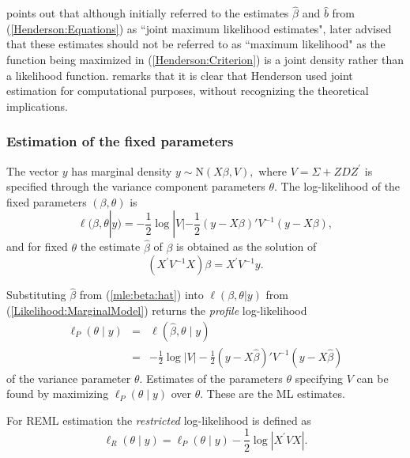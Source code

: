 \documentclass[MAIN.tex]{subfiles}
\begin{document}
	\cite{Robi:BLUP:1991} points out that although \cite{Henderson:1950} initially referred to the estimates $\hat{\beta}$ and $\hat{b}$ from (\ref{Henderson:Equations}) as ``joint maximum likelihood estimates", \cite{Henderson:1973} later advised that these estimates should not be referred to as ``maximum likelihood" as the function being maximized in (\ref{Henderson:Criterion}) is a joint density rather than a likelihood function. \cite{Lee:Neld:Pawi:2006} remarks that it is clear that Henderson used joint estimation for computational purposes, without recognizing the theoretical implications.
	
	\subsubsection{Estimation of the fixed parameters}
	
	The vector $y$ has marginal density $y \sim \mathrm{N}(X \beta,V),$ where $V = \Sigma + ZDZ^\prime$ is specified through the variance component parameters $\theta.$ The log-likelihood of the fixed parameters $(\beta, \theta)$ is
	\begin{equation}
	\ell (\beta, \theta|y) =
	-\frac{1}{2} \log |V| -\frac{1}{2}(y -
	X \beta)'V^{-1}(y -
	X \beta), \label{Likelihood:MarginalModel}
	\end{equation}
	and for fixed $\theta$ the estimate $\hat{\beta}$ of $\beta$ is obtained as the solution of
	\begin{equation}
	(X^\prime V^{-1}X) {\beta} = X^\prime V^{-1}y.
	\label{mle:beta:hat}
	\end{equation}
	
	Substituting $\hat{\beta}$ from (\ref{mle:beta:hat}) into $\ell(\beta, \theta|y)$ from (\ref{Likelihood:MarginalModel}) returns the \emph{profile} log-likelihood
	\begin{eqnarray*}
		\ell_P(\theta \mid y) &=& \ell(\hat{\beta}, \theta \mid y) \\
		&=& -\frac{1}{2} \log |V| -\frac{1}{2}(y - X \hat{\beta})'V^{-1}(y - X \hat{\beta})
	\end{eqnarray*}
	of the variance parameter $\theta.$ Estimates of the parameters $\theta$ specifying $V$ can be found by maximizing $\ell_P(\theta \mid y)$ over $\theta.$ These are the ML estimates.
	
	For REML estimation the \emph{restricted} log-likelihood is defined as
	\[
	\ell_R(\theta \mid y) =
	\ell_P(\theta \mid y) -\frac{1}{2} \log |X^\prime VX |.
	\]
	
\end{document}
